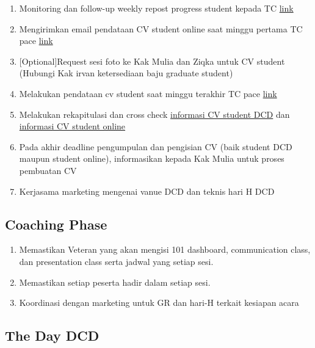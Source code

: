\documentclass[
]{book}
\providecommand{\tightlist}{%
  \setlength{\itemsep}{0pt}\setlength{\parskip}{0pt}}
\begin{document}
\begin{enumerate}
\def\labelenumi{\arabic{enumi}.}
\tightlist
\item
  Monitoring dan follow-up weekly repost progress student kepada TC \href{https://docs.google.com/spreadsheets/d/1kDS77uA1uYJJyS_Oatv_WJTKEOiYXZgkUyEF3CEXo-M/edit\#gid=223180597}{link}
\item
  Mengirimkan email pendataan CV student online saat minggu pertama TC pace \href{http://bit.ly/student-cv-online}{link}
\item
  {[}Optional{]}Request sesi foto ke Kak Mulia dan Ziqka untuk CV student (Hubungi Kak irvan ketersediaan baju graduate student)
\item
  Melakukan pendataan cv student saat minggu terakhir TC pace \href{http://bit.ly/student-cv-dcd9}{link}
\item
  Melakukan rekapitulasi dan cross check \href{http://bit.ly/algo-student-dcd-cv}{informasi CV student DCD} dan \href{http://bit.ly/algo-student-online-cv}{informasi CV student online}
\item
  Pada akhir deadline pengumpulan dan pengisian CV (baik student DCD maupun student online), informasikan kepada Kak Mulia untuk proses pembuatan CV
\item
  Kerjasama marketing mengenai vanue DCD dan teknis hari H DCD
\end{enumerate}

\hypertarget{coaching-phase}{%
\subsection{Coaching Phase}\label{coaching-phase}}

\begin{enumerate}
\def\labelenumi{\arabic{enumi}.}
\tightlist
\item
  Memastikan Veteran yang akan mengisi 101 dashboard, communication class, dan presentation class serta jadwal yang setiap sesi.
\item
  Memastikan setiap peserta hadir dalam setiap sesi.
\item
  Koordinasi dengan marketing untuk GR dan hari-H terkait kesiapan acara
\end{enumerate}

\hypertarget{the-day-dcd}{%
\subsection{The Day DCD}\label{the-day-dcd}}
\end{document}
